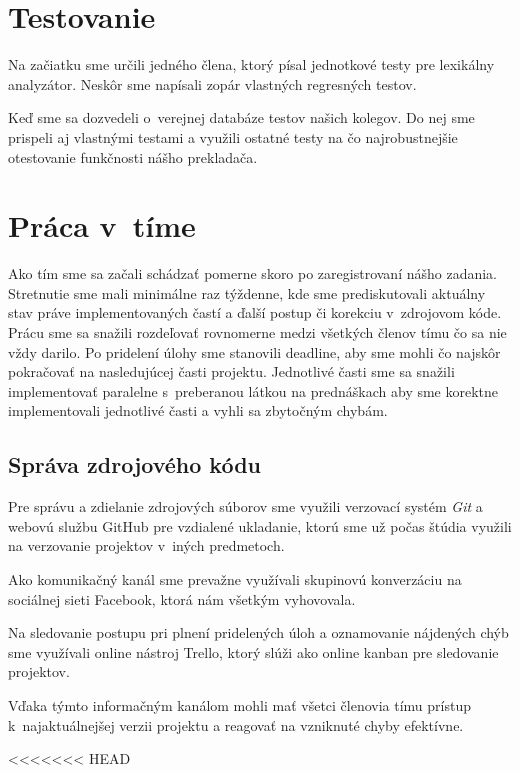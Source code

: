 \documentclass{article}
\begin{document}
\begin{itemize}
    \section{Testovanie}
    Na začiatku sme určili jedného člena, ktorý písal jednotkové testy pre lexikálny analyzátor.
    Neskôr sme napísali zopár vlastných regresných testov.

    Keď sme sa dozvedeli o~verejnej databáze testov našich kolegov. Do nej sme prispeli aj vlastnými testami a využili ostatné testy na čo najrobustnejšie otestovanie funkčnosti nášho prekladača.

    \section{Práca v~tíme}
    Ako tím sme sa začali schádzať pomerne skoro po zaregistrovaní nášho zadania. Stretnutie sme mali
    minimálne raz týždenne, kde sme prediskutovali aktuálny stav práve implementovaných častí
    a ďalší postup či korekciu v~zdrojovom kóde. Prácu sme sa snažili rozdeľovať rovnomerne medzi
    všetkých členov tímu čo sa nie vždy darilo. Po pridelení úlohy sme stanovili deadline, aby sme
    mohli čo najskôr pokračovať na nasledujúcej časti projektu. Jednotlivé časti sme sa snažili
    implementovať paralelne s~preberanou látkou na prednáškach aby sme korektne implementovali
    jednotlivé časti a vyhli sa zbytočným chybám.

        \subsection{Správa zdrojového kódu}
        Pre správu a zdielanie zdrojových súborov sme využili verzovací systém \emph{Git} a webovú službu GitHub pre vzdialené ukladanie, ktorú sme už
        počas štúdia využili na verzovanie projektov v~iných predmetoch.

        Ako komunikačný kanál sme
        prevažne využívali skupinovú konverzáciu na sociálnej sieti Facebook, ktorá nám všetkým
        vyhovovala.

        Na sledovanie postupu pri plnení pridelených úloh a oznamovanie nájdených chýb
        sme využívali online nástroj Trello, ktorý slúži ako online kanban pre sledovanie projektov.

        Vďaka týmto informačným kanálom mohli mať všetci členovia tímu prístup k~najaktuálnejšej
        verzii projektu a reagovať na vzniknuté chyby efektívne.

<<<<<<< HEAD
        \newpage

\end{itemize}
\end{document}
